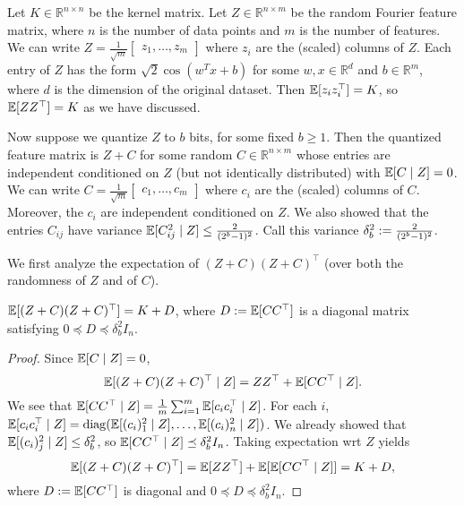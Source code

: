 Let $K \in \mathbb{R}^{n \times n}$ be the kernel matrix.
Let $Z \in \mathbb{R}^{n \times m}$ be the random Fourier feature matrix, where $n$ is
the number of data points and $m$ is the number of features.
We can write $Z = \frac{1}{\sqrt{m}} \begin{bmatrix} z_1, \dots,
  z_m \end{bmatrix}$ where $z_i$ are the (scaled) columns of $Z$.
Each entry of $Z$ has the form $\sqrt{2} \cos(w^T x + b)$ for some $w, x \in
\mathbb{R}^{d}$ and $b \in \mathbb{R}^{m}$, where $d$ is the dimension of the
original dataset.
Then $\mathbb{E}[z_i z_i^\top] = K$, so $\mathbb{E} [Z Z^\top] = K$ as we have discussed.

Now suppose we quantize $Z$ to $b$ bits, for some fixed $b \geq 1$.
Then the quantized feature matrix is $Z + C$ for some random $C \in \mathbb{R}^{n
  \times m}$ whose entries are independent conditioned on $Z$ (but not identically
distributed) with $\mathbb{E}[C \mid Z] = 0$.
We can write $C = \frac{1}{\sqrt{m}} \begin{bmatrix} c_1, \dots,
  c_m \end{bmatrix}$ where $c_i$ are the (scaled) columns of $C$.
Moreover, the $c_i$ are independent conditioned on $Z$.
We also showed that the entries $C_{ij}$ have variance $\mathbb{E}[C_{ij}^2 \mid Z] \leq \frac{2}{(2^b - 1)^2}$.
Call this variance $\delta^2_b := \frac{2}{(2^b - 1)^2}$.

We first analyze the expectation of $(Z + C) (Z + C)^\top$ (over both the
randomness of $Z$ and of $C$).
\begin{proposition}
  $\mathbb{E}[(Z + C)(Z + C)^\top] = K + D$, where $D := \mathbb{E}[C C^\top]$ is a
  diagonal matrix satisfying $0 \preceq D \preceq \delta^2_b I_n$.
  \label{prop:expectation_CCstar}
\end{proposition}

\begin{proof}
  Since $\mathbb{E}[C \mid Z] = 0$,
  \begin{equation*}
    \mathbb{E}[(Z + C) (Z + C)^\top \mid Z] = Z Z^\top + \mathbb{E}[C C^\top \mid Z].
  \end{equation*}
  We see that $\mathbb{E}[C C^\top \mid Z] = \frac{1}{m} \sum_{i=1}^{m} \mathbb{E}[c_i c_i^\top \mid Z]$.
  For each $i$, $\E[c_i c_i^\top \mid Z] = \diag(\E[(c_i)_1^2 \mid Z], \dots,
  \E[(c_i)_n^2 \mid Z])$.
  We already showed that $\mathbb{E}[(c_i)_j^2 \mid Z] \leq \delta^2_b$, so $\mathbb{E}[C C^\top \mid Z] \preceq \delta^2_b I_n$.
  Taking expectation wrt $Z$ yields
  \begin{equation*}
    \mathbb{E}[(Z + C)(Z + C)^\top] = \mathbb{E}[Z Z^\top] + \mathbb{E}[\mathbb{E}[C C^\top \mid Z]] = K + D,
  \end{equation*}
  where $D := \mathbb{E}[C C^\top]$ is diagonal and $0 \preceq D \preceq \delta^2_b I_n$.
\end{proof}


